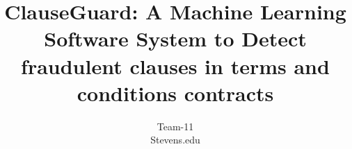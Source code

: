 %

\begin{titlepage}
\centering 
    \title{\textbf{ ClauseGuard: A Machine Learning Software System to Detect fraudulent clauses in terms and conditions contracts }} 
        \author{Team-11 \\ Stevens.edu }
        \conferraldate{}{\today} \maketitle
\end{titlepage}

\makecopyright

\begin{abstract}
\end{abstract}

\begin{Preface}
    
\end{Preface}


% 


\contentspage

\tablelistpage

\figurelistpage

